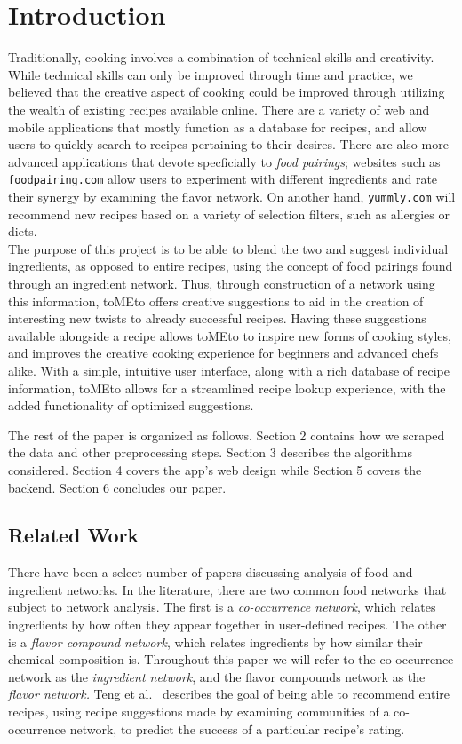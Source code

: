 \documentclass{acm_proc_article-sp}
\begin{document}
\section{Introduction}
Traditionally, cooking involves a combination of technical skills and creativity. While technical skills can only be improved through time and practice, we believed that the creative aspect of cooking could be improved through utilizing the wealth of existing recipes available online. There are a variety of web and mobile applications
that mostly function as a database for recipes, and allow users to quickly search to recipes pertaining to their desires. There are also more advanced applications that devote specficially to \textit{food pairings}; websites such as \texttt{foodpairing.com} allow users to experiment with different ingredients and rate their synergy by examining the flavor network. On another hand, \texttt{yummly.com} will recommend new recipes based on a variety of selection filters, such as allergies or diets. \\
The purpose of this project is to be able to blend the two and suggest individual ingredients, as opposed to entire recipes, using the concept of food pairings found through an ingredient network.
 Thus, through construction of a network using this information, toMEto offers creative suggestions to aid in the creation of interesting new twists to already successful recipes. Having these suggestions available alongside a recipe allows toMEto to inspire new forms of cooking styles, and improves the creative cooking experience for beginners and advanced chefs alike. With a simple, intuitive user interface, along with a rich database of recipe information, toMEto allows for a streamlined recipe lookup experience, with the added functionality of optimized suggestions. 


The rest of the paper is organized as follows. Section 2 contains how we scraped the data and other preprocessing steps. Section 3 describes the algorithms considered. Section 4 covers the app's web design while Section 5 covers the backend. Section 6 concludes our paper. 

\subsection{Related Work}

There have been a select number of papers discussing analysis of food and ingredient networks. In the literature, there are two common food networks that subject to network analysis. The first is a \textit{co-occurrence network}, which relates ingredients by how often they appear together in user-defined recipes. The other is a \textit{flavor compound network}, which relates ingredients by how similar their chemical composition is. Throughout this paper we will refer to the co-occurrence network as the \textit{ingredient network}, and the flavor compounds network as the \textit{flavor network.}
Teng et al.~\cite{recommend} describes the goal of being able to recommend entire recipes, using recipe suggestions made by examining communities of a co-occurrence network, to predict the success of a particular recipe's rating. 
\end{document}
